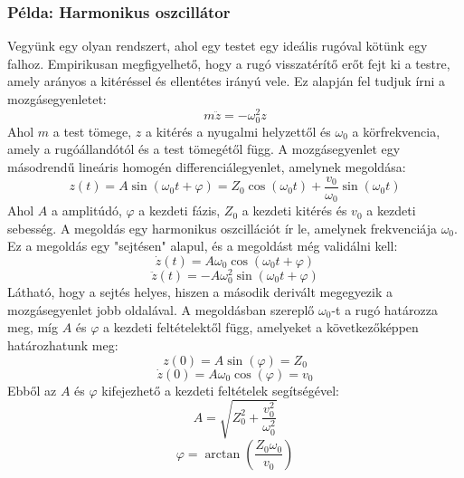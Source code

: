 \documentclass[a4paper,12pt]{article}
\begin{document}
\subsubsection*{Példa: Harmonikus oszcillátor}
Vegyünk egy olyan rendszert, ahol egy testet egy ideális rugóval kötünk egy falhoz. Empirikusan megfigyelhető, hogy a rugó visszatérítő erőt fejt ki a testre, amely arányos a kitéréssel és ellentétes irányú vele. 
Ez alapján fel tudjuk írni a mozgásegyenletet:
\begin{equation}
    m\ddot{z} = -\omega_0^2 z
\end{equation}
Ahol $m$ a test tömege, $z$ a kitérés a nyugalmi helyzettől és $\omega_0$ a körfrekvencia, amely a rugóállandótól és a test tömegétől függ. A mozgásegyenlet egy másodrendű lineáris homogén differenciálegyenlet, amelynek megoldása: 
\begin{equation}
    z(t) = A \sin(\omega_0 t + \varphi) = Z_0\cos(\omega_0 t) + \frac{v_0}{\omega_0}\sin(\omega_0 t)
\end{equation}
Ahol $A$ a amplitúdó, $\varphi$ a kezdeti fázis, $Z_0$ a kezdeti kitérés és $v_0$ a kezdeti sebesség. A megoldás egy harmonikus oszcillációt ír le, amelynek frekvenciája $\omega_0$. Ez a megoldás egy "sejtésen" alapul, 
és a megoldást még validálni kell:
\begin{equation}
    \dot{z}(t) = A\omega_0 \cos(\omega_0 t + \varphi)
\end{equation}
\begin{equation}
    \ddot{z}(t) = -A\omega_0^2 \sin(\omega_0 t + \varphi)
\end{equation}
Látható, hogy a sejtés helyes, hiszen a második derivált megegyezik a mozgásegyenlet jobb oldalával. A megoldásban szereplő $\omega_0$-t a rugó határozza meg, míg $A$ és $\varphi$ a kezdeti feltételektől függ, amelyeket a következőképpen határozhatunk meg:
\begin{equation}
    z(0) = A \sin(\varphi) = Z_0
\end{equation}
\begin{equation}
    \dot{z}(0) = A\omega_0 \cos(\varphi) = v_0
\end{equation}
Ebből az $A$ és $\varphi$ kifejezhető a kezdeti feltételek segítségével:
\begin{equation}
    A = \sqrt{Z_0^2 + \frac{v_0^2}{\omega_0^2}}
\end{equation}
\begin{equation}
    \varphi = \arctan\left(\frac{Z_0 \omega_0}{v_0}\right)
\end{equation}
\end{document}
